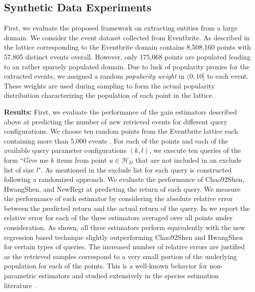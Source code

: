 \documentclass{vldb}
\newcommand{\hierarchy}{\mathcal{H}_D}
\begin{document}
\subsection{Synthetic Data Experiments}
\label{sec:synthetic}
First, we evaluate the proposed framework on extracting entities from a large domain. We consider the event dataset collected from Eventbrite. As described in  the lattice corresponding to the Eventbrite domain contains 8,508,160 points with 57,805 distinct events overall. However, only 175,068 points are populated leading to an rather sparsely populated domain. Due to luck of popularity proxies for the extracted events, we assigned a random {\em popularity weight} in $(0,10]$ to each event. These weights are used during sampling to form the actual popularity distribution characterizing the population of each point in the lattice. 

\noindent\textbf{Results:} First, we evaluate the performance of the gain estimators described above at predicting the number of new retrieved events for different query configurations. We choose ten random points from the Eventbrite lattice each containing more than 5,000 events . For each of the points and each of the available query parameter configurations $(k,l)$, we execute ten queries of the form ``Give me $k$ items from point $u \in \hierarchy$ that are not included in an exclude list of size $l$". As mentioned in  the exclude list for each query is constructed following a randomized approach. We evaluate the performance of Chao92Shen, HwangShen, and NewRegr at predicting the return of each query. We measure the performance of each estimator by considering the absolute relative error between the predicted return and the actual return of the query. In  we report the relative error for each of the three estimators averaged over all points under consideration. As shown, all three estimators perform equivalently with the new regression based technique slightly outperforming Chao92Shen and HwangShen for certain types of queries. The increased number of relative errors are justified as the retrieved samples correspond to a very small portion of the underlying population for each of the points. This is a well-known behavior for non-parametric estimators and studied extensively in the species estimation literature~\cite{hwang:2010}. 
\end{document}
